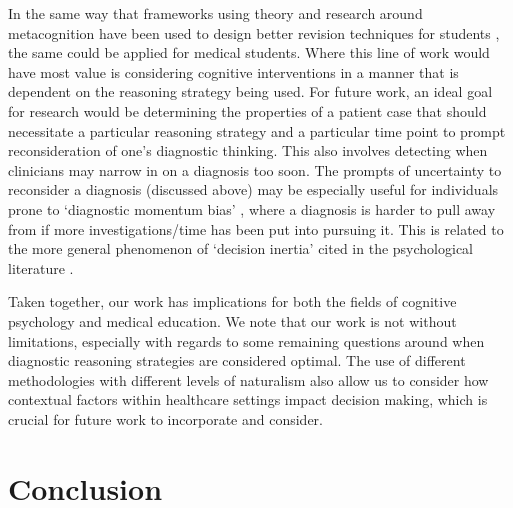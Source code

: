 \documentclass[a4paper, nobind]{templates/ociamthesis}
\begin{document}
In the same way that frameworks using theory and research around metacognition have been used to design better revision techniques for students \autocite{dunlosky_strengthening_2013,putnam_optimizing_2016}, the same could be applied for medical students. Where this line of work would have most value is considering cognitive interventions in a manner that is dependent on the reasoning strategy being used. For future work, an ideal goal for research would be determining the properties of a patient case that should necessitate a particular reasoning strategy and a particular time point to prompt reconsideration of one's diagnostic thinking. This also involves detecting when clinicians may narrow in on a diagnosis too soon. The prompts of uncertainty to reconsider a diagnosis (discussed above) may be especially useful for individuals prone to `diagnostic momentum bias' \autocite{ryan_diagnostic_2021,aron_diagnostic_2024}, where a diagnosis is harder to pull away from if more investigations/time has been put into pursuing it. This is related to the more general phenomenon of `decision inertia' cited in the psychological literature \autocite{akaishi_autonomous_2014}.

Taken together, our work has implications for both the fields of cognitive psychology and medical education. We note that our work is not without limitations, especially with regards to some remaining questions around when diagnostic reasoning strategies are considered optimal. The use of different methodologies with different levels of naturalism also allow us to consider how contextual factors within healthcare settings impact decision making, which is crucial for future work to incorporate and consider.

\section{Conclusion}\label{conclusion}
\end{document}
